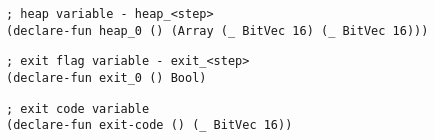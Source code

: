 \begin{algorithm}[H]
\end{algorithm}

\begin{lstlisting}[language=SMTLib]
; heap variable - heap_<step>
(declare-fun heap_0 () (Array (_ BitVec 16) (_ BitVec 16)))
\end{lstlisting}


\begin{algorithm}[H]
\end{algorithm}

\begin{algorithm}[H]
\end{algorithm}

\begin{lstlisting}[language=SMTLib]
; exit flag variable - exit_<step>
(declare-fun exit_0 () Bool)
\end{lstlisting}


\begin{algorithm}[H]
\end{algorithm}

\begin{algorithm}[H]
  \Fn{\DeclareExitCode{}}{
    \Formula \Append \DeclareBool{\ExitCodeVar{}} \Append \EOL \Append \EOL\;
  }
\end{algorithm}

\begin{lstlisting}[language=SMTLib]
; exit code variable
(declare-fun exit-code () (_ BitVec 16))
\end{lstlisting}



